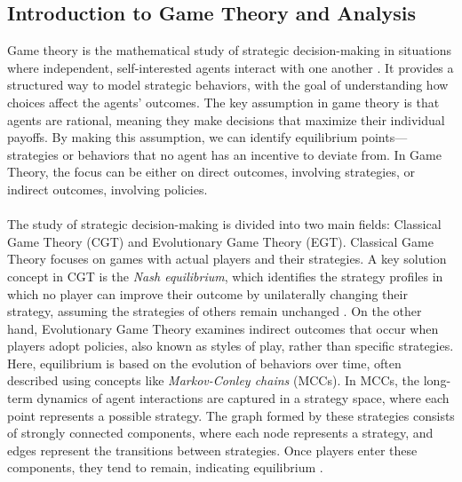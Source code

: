 \subsection{Introduction to Game Theory and Analysis}

\begin{flushleft}

    Game theory is the mathematical study of strategic decision-making in situations where independent, self-interested agents interact with one another \cite{Shoham_Leyton-Brown_2008}. It provides a structured way to model strategic behaviors, with the goal of understanding how choices affect the agents' outcomes. The key assumption in game theory is that agents are rational, meaning they make decisions that maximize their individual payoffs. By making this assumption, we can identify equilibrium points—strategies or behaviors that no agent has an incentive to deviate from. In Game Theory, the focus can be either on direct outcomes, involving strategies, or indirect outcomes, involving policies.\\~\\

    The study of strategic decision-making is divided into two main fields: Classical Game Theory (CGT) and Evolutionary Game Theory (EGT). Classical Game Theory focuses on games with actual players and their strategies. A key solution concept in CGT is the \emph{Nash equilibrium}, which identifies the strategy profiles in which no player can improve their outcome by unilaterally changing their strategy, assuming the strategies of others remain unchanged \cite{doi:10.1073/pnas.36.1.48}. On the other hand, Evolutionary Game Theory examines indirect outcomes that occur when players adopt policies, also known as styles of play, rather than specific strategies. Here, equilibrium is based on the evolution of behaviors over time, often described using concepts like \emph{Markov-Conley chains} (MCCs). In MCCs, the long-term dynamics of agent interactions are captured in a strategy space, where each point represents a possible strategy. The graph formed by these strategies consists of strongly connected components, where each node represents a strategy, and edges represent the transitions between strategies. Once players enter these components, they tend to remain, indicating equilibrium \cite{omidshafiei2019alpharank}.\\~\\


\end{flushleft}
